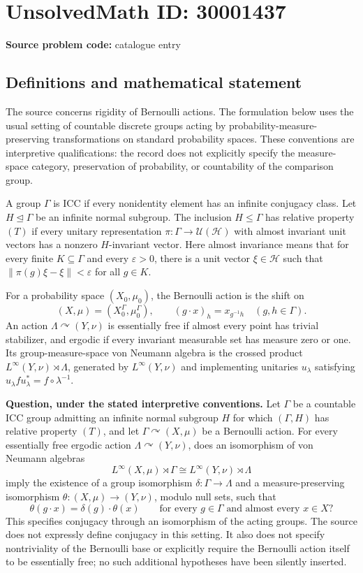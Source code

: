 \documentclass[11pt]{article}
\begin{document}
\section*{UnsolvedMath ID: 30001437}
\textbf{Source problem code:} catalogue entry
\subsection{Definitions and mathematical statement}
The source concerns rigidity of Bernoulli actions. The formulation below uses the usual setting of countable discrete groups acting by probability-measure-preserving transformations on standard probability spaces. These conventions are interpretive qualifications: the record does not explicitly specify the measure-space category, preservation of probability, or countability of the comparison group.

A group \(\Gamma\) is ICC if every nonidentity element has an infinite conjugacy class. Let \(H\trianglelefteq\Gamma\) be an infinite normal subgroup. The inclusion \(H\leq\Gamma\) has relative property \((T)\) if every unitary representation \(\pi:\Gamma\to\mathcal U(\mathcal H)\) with almost invariant unit vectors has a nonzero \(H\)-invariant vector. Here almost invariance means that for every finite \(K\subseteq\Gamma\) and every \(\varepsilon>0\), there is a unit vector \(\xi\in\mathcal H\) such that \(\|\pi(g)\xi-\xi\|<\varepsilon\) for all \(g\in K\).

For a probability space \((X_0,\mu_0)\), the Bernoulli action is the shift on
\[
(X,\mu)=(X_0^{\Gamma},\mu_0^{\Gamma}),\qquad
(g\cdot x)_h=x_{g^{-1}h}\quad(g,h\in\Gamma).
\]
An action \(\Lambda\curvearrowright(Y,\nu)\) is essentially free if almost every point has trivial stabilizer, and ergodic if every invariant measurable set has measure zero or one. Its group-measure-space von Neumann algebra is the crossed product \(L^{\infty}(Y,\nu)\rtimes\Lambda\), generated by \(L^{\infty}(Y,\nu)\) and implementing unitaries \(u_\lambda\) satisfying \(u_\lambda f u_\lambda^*=f\circ\lambda^{-1}\).

\textbf{Question, under the stated interpretive conventions.} Let \(\Gamma\) be a countable ICC group admitting an infinite normal subgroup \(H\) for which \((\Gamma,H)\) has relative property \((T)\), and let \(\Gamma\curvearrowright(X,\mu)\) be a Bernoulli action. For every essentially free ergodic action \(\Lambda\curvearrowright(Y,\nu)\), does an isomorphism of von Neumann algebras
\[
L^{\infty}(X,\mu)\rtimes\Gamma
\cong
L^{\infty}(Y,\nu)\rtimes\Lambda
\]
imply the existence of a group isomorphism \(\delta:\Gamma\to\Lambda\) and a measure-preserving isomorphism \(\theta:(X,\mu)\to(Y,\nu)\), modulo null sets, such that
\[
\theta(g\cdot x)=\delta(g)\cdot\theta(x)
\qquad\text{for every }g\in\Gamma\text{ and almost every }x\in X?
\]
This specifies conjugacy through an isomorphism of the acting groups. The source does not expressly define conjugacy in this setting. It also does not specify nontriviality of the Bernoulli base or explicitly require the Bernoulli action itself to be essentially free; no such additional hypotheses have been silently inserted.
\end{document}
